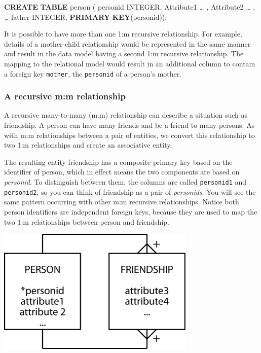 \documentclass[
]{article}
\newenvironment{Shaded}{\begin{snugshade}}{\end{snugshade}}
\newcommand{\DataTypeTok}[1]{\textcolor[rgb]{0.13,0.29,0.53}{#1}}
\newcommand{\KeywordTok}[1]{\textcolor[rgb]{0.13,0.29,0.53}{\textbf{#1}}}
\newcommand{\NormalTok}[1]{#1}
\begin{document}
\begin{Shaded}
\begin{Highlighting}[]
\KeywordTok{CREATE} \KeywordTok{TABLE}\NormalTok{ person (}
\NormalTok{    personid        }\DataTypeTok{INTEGER}\NormalTok{,}
\NormalTok{    Attribute1      … ,}
\NormalTok{    Attribute2      … ,}
\NormalTok{    …}
\NormalTok{    father      }\DataTypeTok{INTEGER}\NormalTok{,}
        \KeywordTok{PRIMARY} \KeywordTok{KEY}\NormalTok{(personid));}
\end{Highlighting}
\end{Shaded}

It is possible to have more than one 1:m recursive relationship. For
example, details of a mother-child relationship would be represented in
the same manner and result in the data model having a second 1:m
recursive relationship. The mapping to the relational model would result
in an additional column to contain a foreign key \texttt{mother}, the
\texttt{personid} of a person's mother.

\hypertarget{a-recursive-mm-relationship}{%
\subsubsection*{A recursive m:m relationship}\label{a-recursive-mm-relationship}}

A recursive many-to-many (m:m) relationship can describe a situation
such as friendship. A person can have many friends and be a friend to
many persons. As with m:m relationships between a pair of entities, we
convert this relationship to two 1:m relationships and create an
associative entity.

The resulting entity friendship has a composite primary key based on the
identifier of person, which in effect means the two components are based
on \emph{personid}. To distinguish between them, the columns are called
\texttt{personid1} and \texttt{personid2}, so you can think of friendship as a pair of
\emph{personids}. You will see the same pattern occurring with other m:m
recursive relationships. Notice both person identifiers are independent
foreign keys, because they are used to map the two 1:m relationships
between person and friendship.

\includegraphics[width=3.72917in,height=\textheight]{Figures/Reference 1/r1-person-m-m.png}
\end{document}
